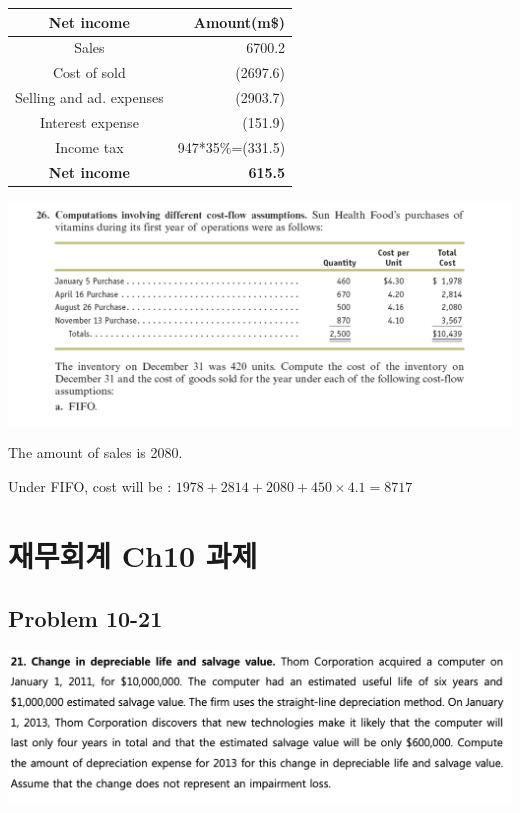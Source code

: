 \documentclass[
  a4paper,
  DIV=11,
  numbers=noendperiod]{scrreprt}
\begin{document}
\begin{longtable}[]{@{}cr@{}}
\toprule\noalign{}
Net income & Amount(m\$) \\
\midrule\noalign{}
\endhead
\bottomrule\noalign{}
\endlastfoot
Sales & 6700.2 \\
Cost of sold & (2697.6) \\
Selling and ad. expenses & (2903.7) \\
Interest expense & (151.9) \\
Income tax & 947*35\%=(331.5) \\
\textbf{Net income} & \textbf{615.5} \\
\end{longtable}

\includegraphics{images/재무회계9-26.png}

The amount of sales is 2080.

Under FIFO, cost will be : \(1978+2814+2080+450\times 4.1=8717\)

\chapter*{재무회계 Ch10
과제}\label{uxc7acuxbb34uxd68cuxacc4-ch10-uxacfcuxc81c}


\section*{Problem 10-21}\label{problem-10-21}


\includegraphics{images/재무회계_10-21.png}
\end{document}
